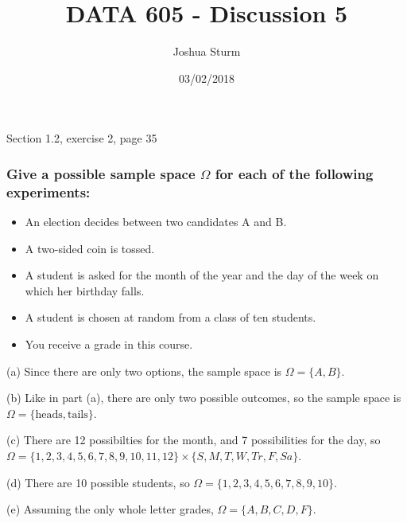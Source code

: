 \documentclass[]{article}
\title{DATA 605 - Discussion 5}
\author{Joshua Sturm}
\date{03/02/2018}
\begin{document}
\maketitle

Section 1.2, exercise 2, page 35

\subsubsection{\texorpdfstring{Give a possible sample space \(\Omega\)
for each of the following
experiments:}{Give a possible sample space \textbackslash{}Omega for each of the following experiments:}}\label{give-a-possible-sample-space-omega-for-each-of-the-following-experiments}

\begin{itemize}
\item An election decides between two candidates A and B.
\item A two-sided coin is tossed.
\item A student is asked for the month of the year and the day of the week on which her birthday falls.
\item A student is chosen at random from a class of ten students.
\item You receive a grade in this course.
\end{itemize}

\indent (a) Since there are only two options, the sample space is
\(\Omega = \{A, B\}\).

\indent (b) Like in part (a), there are only two possible outcomes, so
the sample space is \(\Omega = \{\text{heads}, \text{tails}\}\).

\indent (c) There are 12 possibilties for the month, and 7 possibilities
for the day, so
\(\Omega = \{1,2,3,4,5,6,7,8,9,10,11,12\} \times \{S, M, T, W, Tr, F, Sa\}\).

\indent (d) There are 10 possible students, so
\(\Omega = \{1, 2, 3, 4, 5, 6, 7, 8, 9, 10\}\).

\indent (e) Assuming the only whole letter grades,
\(\Omega = \{A, B, C, D, F\}\).
\end{document}
